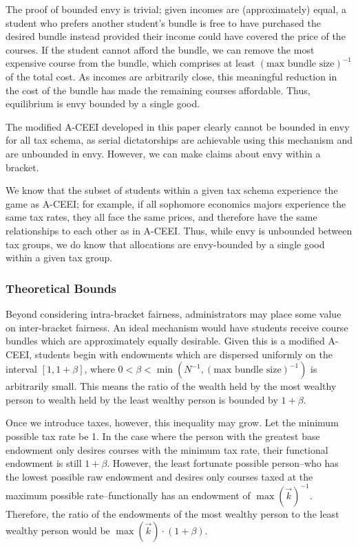 \documentclass{article}
\begin{document}
The proof of bounded envy is trivial; given incomes are (approximately) equal, a student who prefers another student's bundle is free to have purchased the desired bundle instead provided their income could have covered the price of the courses. If the student cannot afford the bundle, we can remove the most expensive course from the bundle, which comprises at least $(\mbox{max bundle size})^{-1}$ of the total cost. As incomes are arbitrarily close, this meaningful reduction in the cost of the bundle has made the remaining courses affordable. Thus, equilibrium is envy bounded by a single good.

The modified A-CEEI developed in this paper clearly cannot be bounded in envy for all tax schema, as serial dictatorships are achievable using this mechanism and are unbounded in envy. However, we can make claims about envy within a bracket.

We know that the subset of students within a given tax schema experience the game as A-CEEI; for example, if all sophomore economics majors experience the same tax rates, they all face the same prices, and therefore have the same relationships to each other as in A-CEEI. Thus, while envy is unbounded between tax groups, we do know that allocations are envy-bounded by a single good within a given tax group.



\subsubsection{Theoretical Bounds}

Beyond considering intra-bracket fairness, administrators may place some value on inter-bracket fairness. An ideal mechanism would have students receive course bundles which are approximately equally desirable. Given this is a modified A-CEEI, students begin with endowments which are dispersed uniformly on the interval $[1, 1 + \beta]$, where $0 < \beta < \min\left(N^{-1}, (\mbox{max bundle size})^{-1}\right)$ is arbitrarily small. This means the ratio of the wealth held by the most wealthy person to wealth held by the least wealthy person is bounded by $1 + \beta$.

Once we introduce taxes, however, this inequality may grow. Let the minimum possible tax rate be 1. In the case where the person with the greatest base endowment only desires courses with the minimum tax rate, their functional endowment is still $1 + \beta$. However, the least fortunate possible person--who has the lowest possible raw endowment and desires only courses taxed at the maximum possible rate--functionally has an endowment of $\max(\vec{k})^{-1}$. Therefore, the ratio of the endowments of the most wealthy person to the least wealthy person would be $\max(\vec{k}) \cdot (1 + \beta)$.
\end{document}
